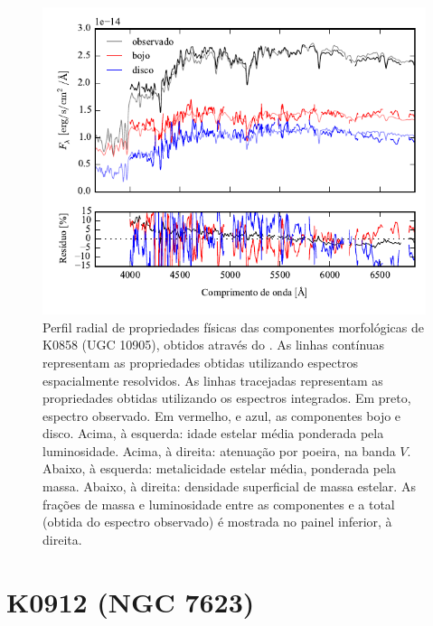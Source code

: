 \begin{figure}
	\includegraphics[page=16]{figuras/sample006a_synthesis}
	\caption[Propriedades físicas das componentes morfológicas de K0858 (UGC 10905)]
	{Perfil radial de propriedades físicas das componentes morfológicas de
	K0858 (UGC 10905), obtidos através do \starlight. As linhas contínuas
	representam as propriedades obtidas utilizando espectros espacialmente
	resolvidos. As linhas tracejadas representam as propriedades obtidas utilizando
	os espectros integrados. Em preto, espectro observado. Em vermelho, e azul, as
	componentes bojo e disco. Acima, à esquerda: idade estelar média ponderada pela
	luminosidade. Acima, à direita: atenuação por poeira, na banda $V$. Abaixo, à
	esquerda: metalicidade estelar média, ponderada pela massa. Abaixo, à direita:
	densidade superficial de massa estelar. As frações de massa e luminosidade
	entre as componentes e a total (obtida do espectro observado) é mostrada no
	painel inferior, à direita.}
	\label{fig:decompSinteseRadprof:K0858}
\end{figure}

\FloatBarrier


\section{K0912 (NGC 7623)}
\label{apendice:Decomp:K0912}

